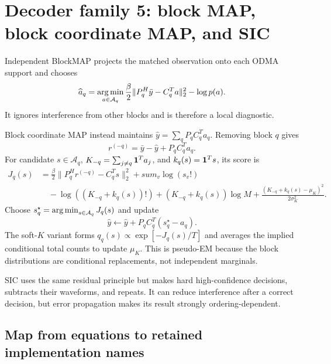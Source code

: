 \documentclass[11pt]{article}
\begin{document}
\section{Decoder family 5: block MAP, block coordinate MAP, and SIC}

Independent BlockMAP projects the matched observation onto each ODMA support and chooses
\[
 \widehat a_q=\operatorname*{arg\,min}_{a\in\mathcal A_q}
 \frac{\beta}{2}\|P_q^H\bar y-C_q^Ta\|_2^2-\log p(a).
\]
It ignores interference from other blocks and is therefore a local diagnostic.

Block coordinate MAP instead maintains $\widehat y=\sum_qP_qC_q^Ta_q$. Removing block $q$ gives
\[
 r^{(-q)}=\bar y-\widehat y+P_qC_q^Ta_q.
\]
For candidate $s\in\mathcal A_q$, $K_{-q}=\sum_{j\ne q}\mathbf{1}^Ta_j$, and $k_q(s)=\mathbf{1}^Ts$, its score is
\begin{align*}
 J_q(s)&=\frac{\beta}{2}\|P_q^Hr^{(-q)}-C_q^Ts\|_2^2+sum_v\log(s_v!)\\
 &\quad-\log((K_{-q}+k_q(s))!)+(K_{-q}+k_q(s))\log M
 +\frac{(K_{-q}+k_q(s)-\mu_K)^2}{2\sigma_K^2}.
\end{align*}
Choose $s_q^\star=\operatorname*{arg\,min}_{s\in\mathcal A_q}J_q(s)$ and update
\[
 \widehat y\leftarrow\widehat y+P_qC_q^T(s_q^\star-a_q).
\]
The soft-$K$ variant forms $q_q(s)\propto\exp[-J_q(s)/T]$ and averages the implied conditional total counts to update
$\mu_K$. This is pseudo-EM because the block distributions are conditional replacements, not independent marginals.

SIC uses the same residual principle but makes hard high-confidence decisions, subtracts their waveforms, and repeats.
It can reduce interference after a correct decision, but error propagation makes its result strongly ordering-dependent.

\subsection{Map from equations to retained implementation names}
\end{document}
